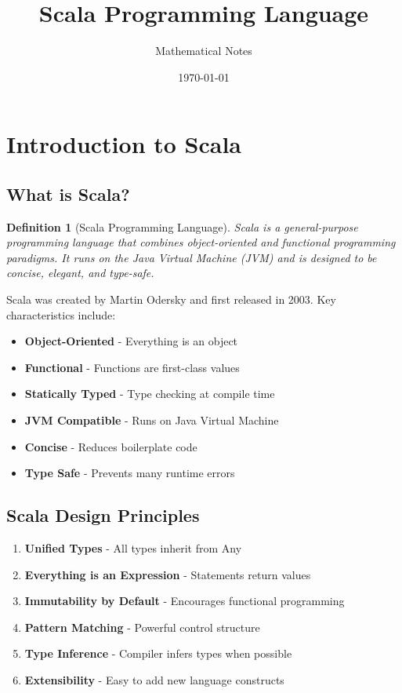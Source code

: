 \documentclass[11pt]{article}
\title{Scala Programming Language}
\author{Mathematical Notes}
\date{\today}
\newtheorem{definition}{Definition}[section]
\begin{document}
\maketitle
\tableofcontents
\newpage

\section{Introduction to Scala}

\subsection{What is Scala?}

\begin{definition}[Scala Programming Language]
Scala is a general-purpose programming language that combines object-oriented and functional programming paradigms. It runs on the Java Virtual Machine (JVM) and is designed to be concise, elegant, and type-safe.
\end{definition}

Scala was created by Martin Odersky and first released in 2003. Key characteristics include:
\begin{itemize}
    \item \textbf{Object-Oriented} - Everything is an object
    \item \textbf{Functional} - Functions are first-class values
    \item \textbf{Statically Typed} - Type checking at compile time
    \item \textbf{JVM Compatible} - Runs on Java Virtual Machine
    \item \textbf{Concise} - Reduces boilerplate code
    \item \textbf{Type Safe} - Prevents many runtime errors
\end{itemize}

\subsection{Scala Design Principles}

\begin{enumerate}
    \item \textbf{Unified Types} - All types inherit from Any
    \item \textbf{Everything is an Expression} - Statements return values
    \item \textbf{Immutability by Default} - Encourages functional programming
    \item \textbf{Pattern Matching} - Powerful control structure
    \item \textbf{Type Inference} - Compiler infers types when possible
    \item \textbf{Extensibility} - Easy to add new language constructs
\end{enumerate}
\end{document}
